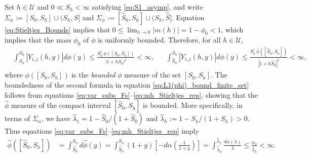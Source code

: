 \documentclass[english,12pt,jmp,graphicx]{revtex4-1}
\newcommand{\ph}{\hat{\phi}}
\begin{document}
Set $h\in\mathcal{U}$ and $0\ll S_h<\infty$ satisfying
\eqref{eq:S1_asymp}, and write $\Sigma_\phi:=[S_0,S_h]\cup(S_h,S]$ and
$\Sigma_\phi:=[\hat{S}_0,S_h]\cup(S_h,\hat{S}]$. Equation \eqref{eq:Stieltjes_Bounds} 
implies that $0\leq\lim_{h\to0}|m(h)|=1-\phi_0<1$, which implies that the mass
$\phi_0$ of $\phi$ is uniformly bounded. Therefore, for all $h\in\mathcal{U}$, 
%
\begin{align}\label{eq:L1(phi)_bound_finite_set}
  &\int_{S_0}^{S_h}|Y_{i,j}(h,y)| d\phi(y)\leq
  \frac{S_h^i\,\phi([S_0,S_h])}{|1+hS_0|^j}<\infty,
 &&
  \int_{\hat{S}_0}^{S_h}|Y_{i,j}(h,y)| d\phi(y)\leq
  \frac{S_h^i\,\ph([\hat{S}_0,S_h])}{|1+h\hat{S}_0|^j}<\infty,
\end{align}
%
where $\phi([S_0,S_h])$ is the \emph{bounded} $\phi$ measure of the set
$[S_0,S_h]$. The boundedness of the second formula in equation
\eqref{eq:L1(phi)_bound_finite_set} follows from equations
\eqref{eq:var_subs_Fs}--\eqref{eq:mh_Stieltjes_rep}, 
showing that the $\ph$ measure of the compact interval
$[\hat{S}_0,S_h]$ is bounded. More specifically, in terms of
$\Sigma_\alpha$, we have $\hat{\lambda}_1=1-\hat{S}_0/(1+\hat{S}_0)$ and
$\hat{\lambda}_h:=1-S_h/(1+S_h)>0$. Thus equations
\eqref{eq:var_subs_Fs}--\eqref{eq:mh_Stieltjes_rep} imply  
%
\begin{align*}%
  \ph([\hat{S}_0,S_h])&=\int_{\hat{S}_0}^{S_h}d\ph(y)
         =\int_{\hat{S}_0}^{S_h}(1+y)\left[-d\alpha\left(\frac{1}{1+y}\right)\right]
         =\int_{\hat{\lambda}_h}^{\hat{\lambda}_1}\frac{d\alpha(\lambda)}{\lambda}
         \leq\frac{\alpha_0}{\hat{\lambda}_h}<\infty.
\end{align*}
%
\end{document}

